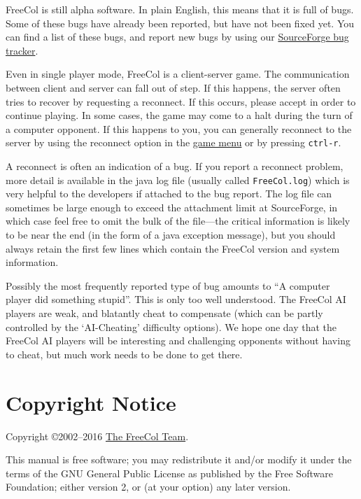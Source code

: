 \documentclass[12pt]{book}
\begin{document}
FreeCol is still alpha software. In plain English, this means that it
is full of bugs. Some of these bugs have already been reported, but
have not been fixed yet. You can find a list of these bugs, and report
new bugs by using our
\href{http://sourceforge.net/tracker/?group_id=43225&atid=435578}{SourceForge
bug tracker}.

Even in single player mode, FreeCol is a client-server game. The
communication between client and server can fall out of step. If this
happens, the server often tries to recover by requesting a
reconnect. If this occurs, please accept in order to continue
playing. In some cases, the game may come to a halt during the turn of
a computer opponent. If this happens to you, you can generally
reconnect to the server by using the reconnect option in the
\hyperlink{game menu}{game menu} or by pressing \verb$ctrl-r$.

A reconnect is often an indication of a bug. If you report a
reconnect problem, more detail is available in the java log file
(usually called \texttt{FreeCol.log}) which is very helpful to the
developers if attached to the bug report. The log file can sometimes
be large enough to exceed the attachment limit at SourceForge, in
which case feel free to omit the bulk of the file---the critical
information is likely to be near the end (in the form of a
java exception message), but you should always retain the first few
lines which contain the FreeCol version and system information.

Possibly the most frequently reported type of bug amounts to ``A
computer player did something stupid''. This is only too well
understood. The FreeCol AI players are weak, and blatantly cheat to
compensate (which can be partly controlled by the `AI-Cheating'
difficulty options). We hope one day that the FreeCol AI players will
be interesting and challenging opponents without having to cheat,
but much work needs to be done to get there.

\hypertarget{Copyright Notice}{\chapter{Copyright Notice}}

Copyright \copyright 2002--2016
\href{http://freecol.sourceforge.net/index.php?section=8}{The FreeCol
Team}.

This manual is free software; you may redistribute it and/or modify it
under the terms of the GNU General Public License as published by the
Free Software Foundation; either version 2, or (at your option) any
later version.
\end{document}
